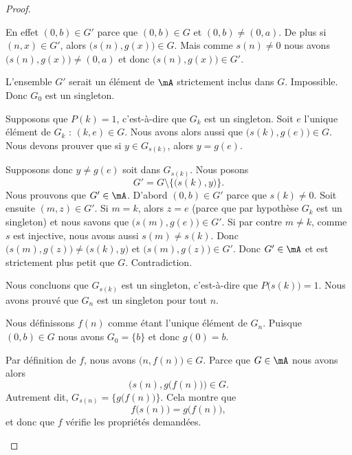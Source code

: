\begin{proof}
\begin{subproof}
\begin{subproof}
			En effet \( (0,b)\in G'\) parce que \( (0,b)\in G\) et \( (0,b)\neq (0,a)\). De plus si \( (n,x)\in G'\), alors \( \big( s(n),g(x) \big)\in G\). Mais comme \( s(n)\neq 0\) nous avons \( \big( s(n),g(x) \big)\neq (0,a)\) et donc \( \big( s(n),g(x) \big)\in G'\).

			L'ensemble \( G'\) serait un élément de \( \mA\) strictement inclus dans \( G\). Impossible. Donc \( G_0\) est un singleton.

			\spitem[Récurrence]
			Supposons que \( P(k)=1\), c'est-à-dire que \( G_k\) est un singleton. Soit \( e\) l'unique élément de \( G_k\) : \( (k,e)\in G\). Nous avons alors aussi que \( \big( s(k),g(e) \big)\in G\). Nous devons prouver que si \( y\in G_{s(k)}\), alors \( y=g(e)\).

			Supposons donc \( y\neq g(e)\) soit dans \( G_{s(k)}\). Nous posons
			\begin{equation}
				G'=G\setminus\{ \big( s(k),y \big) \}.
			\end{equation}
			Nous prouvons que \( G'\in\mA\). D'abord \( (0,b)\in G'\) parce que \( s(k)\neq 0\). Soit ensuite \( (m,z)\in G'\). Si \( m=k\), alors \( z=e\) (parce que par hypothèse \( G_k\) est un singleton) et nous savons que \( \big( s(m),g(e) \big)\in G'\). Si par contre \( m\neq k\), comme  \( s\) est injective, nous avons aussi \( s(m)\neq s(k)\). Donc \( \big( s(m),g(z) \big)\neq \big( s(k),y \big)\) et \( \big( s(m),g(z) \big)\in G'\). Donc \( G'\in \mA\) et est strictement plus petit que \( G\). Contradiction.

			Nous concluons que \( G_{s(k)}\) est un singleton, c'est-à-dire que \( P\big( s(k) \big)=1\).
			\spitem[Conclusion]
			Nous avons prouvé que \( G_n\) est un singleton pour tout \( n\).
		\end{subproof}

		\spitem[Et enfin]

		Nous définissons \( f(n)\) comme étant l'unique élément de \( G_n\). Puisque \( (0,b)\in G\) nous avons \( G_0=\{ b \}\) et donc \( g(0)=b\).

		Par définition de \( f\), nous avons \( \big( n,f(n) \big)\in G\). Parce que \( G\in\mA\) nous avons alors
		\begin{equation}
			\big( s(n),g\big( f(n) \big) \big)\in G.
		\end{equation}
		Autrement dit, \( G_{s(n)}= \{  g\big( f(n) \big) \}\). Cela montre que
		\begin{equation}
			f\big( s(n) \big)=g\big( f(n) \big),
		\end{equation}
		et donc que \( f\) vérifie les propriétés demandées.
	\end{subproof}
\end{proof}

